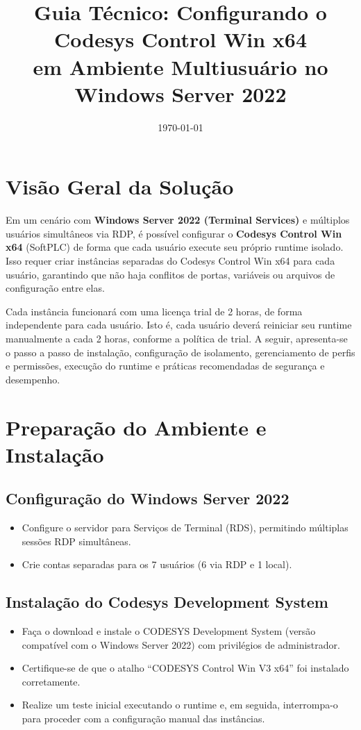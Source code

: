 \documentclass[12pt,a4paper]{article}
\title{Guia Técnico: Configurando o Codesys Control Win x64\\ em Ambiente Multiusuário no Windows Server 2022}
\author{}
\date{\today}
\begin{document}
\maketitle

\section{Visão Geral da Solução}
Em um cenário com \textbf{Windows Server 2022 (Terminal Services)} e múltiplos usuários simultâneos via RDP, é possível configurar o \textbf{Codesys Control Win x64} (SoftPLC) de forma que cada usuário execute seu próprio runtime isolado. Isso requer criar instâncias separadas do Codesys Control Win x64 para cada usuário, garantindo que não haja conflitos de portas, variáveis ou arquivos de configuração entre elas.

Cada instância funcionará com uma licença trial de 2 horas, de forma independente para cada usuário. Isto é, cada usuário deverá reiniciar seu runtime manualmente a cada 2 horas, conforme a política de trial. A seguir, apresenta-se o passo a passo de instalação, configuração de isolamento, gerenciamento de perfis e permissões, execução do runtime e práticas recomendadas de segurança e desempenho.

\section{Preparação do Ambiente e Instalação}

\subsection{Configuração do Windows Server 2022}
\begin{itemize}[label=\textbullet]
  \item Configure o servidor para Serviços de Terminal (RDS), permitindo múltiplas sessões RDP simultâneas.
  \item Crie contas separadas para os 7 usuários (6 via RDP e 1 local).
\end{itemize}

\subsection{Instalação do Codesys Development System}
\begin{itemize}[label=\textbullet]
  \item Faça o download e instale o CODESYS Development System (versão compatível com o Windows Server 2022) com privilégios de administrador.
  \item Certifique-se de que o atalho ``CODESYS Control Win V3 x64'' foi instalado corretamente.
  \item Realize um teste inicial executando o runtime e, em seguida, interrompa-o para proceder com a configuração manual das instâncias.
\end{itemize}
\end{document}
